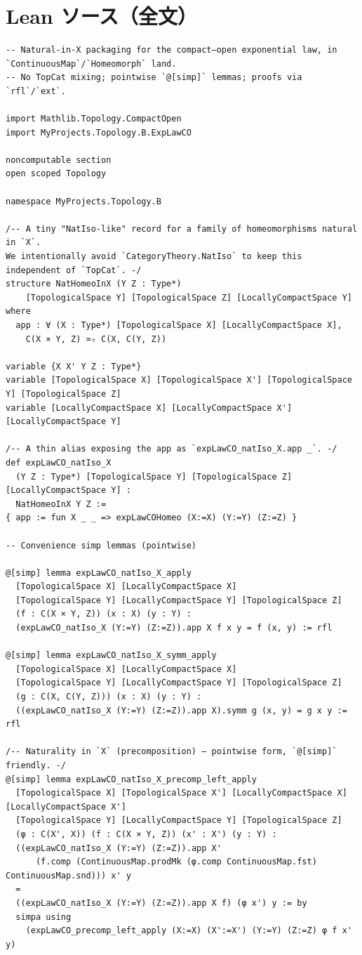 \documentclass[12pt]{article}
\theoremstyle{definition}
\begin{document}
\section*{Lean ソース（全文）}
\begin{lstlisting}
-- Natural-in-X packaging for the compact–open exponential law, in `ContinuousMap`/`Homeomorph` land.
-- No TopCat mixing; pointwise `@[simp]` lemmas; proofs via `rfl`/`ext`.

import Mathlib.Topology.CompactOpen
import MyProjects.Topology.B.ExpLawCO

noncomputable section
open scoped Topology

namespace MyProjects.Topology.B

/-- A tiny "NatIso-like" record for a family of homeomorphisms natural in `X`.
We intentionally avoid `CategoryTheory.NatIso` to keep this independent of `TopCat`. -/
structure NatHomeoInX (Y Z : Type*)
    [TopologicalSpace Y] [TopologicalSpace Z] [LocallyCompactSpace Y] where
  app : ∀ (X : Type*) [TopologicalSpace X] [LocallyCompactSpace X],
    C(X × Y, Z) ≃ₜ C(X, C(Y, Z))

variable {X X' Y Z : Type*}
variable [TopologicalSpace X] [TopologicalSpace X'] [TopologicalSpace Y] [TopologicalSpace Z]
variable [LocallyCompactSpace X] [LocallyCompactSpace X'] [LocallyCompactSpace Y]

/-- A thin alias exposing the app as `expLawCO_natIso_X.app _`. -/
def expLawCO_natIso_X
  (Y Z : Type*) [TopologicalSpace Y] [TopologicalSpace Z] [LocallyCompactSpace Y] :
  NatHomeoInX Y Z :=
{ app := fun X _ _ => expLawCOHomeo (X:=X) (Y:=Y) (Z:=Z) }

-- Convenience simp lemmas (pointwise)

@[simp] lemma expLawCO_natIso_X_apply
  [TopologicalSpace X] [LocallyCompactSpace X]
  [TopologicalSpace Y] [LocallyCompactSpace Y] [TopologicalSpace Z]
  (f : C(X × Y, Z)) (x : X) (y : Y) :
  (expLawCO_natIso_X (Y:=Y) (Z:=Z)).app X f x y = f (x, y) := rfl

@[simp] lemma expLawCO_natIso_X_symm_apply
  [TopologicalSpace X] [LocallyCompactSpace X]
  [TopologicalSpace Y] [LocallyCompactSpace Y] [TopologicalSpace Z]
  (g : C(X, C(Y, Z))) (x : X) (y : Y) :
  ((expLawCO_natIso_X (Y:=Y) (Z:=Z)).app X).symm g (x, y) = g x y := rfl

/-- Naturality in `X` (precomposition) — pointwise form, `@[simp]` friendly. -/
@[simp] lemma expLawCO_natIso_X_precomp_left_apply
  [TopologicalSpace X] [TopologicalSpace X'] [LocallyCompactSpace X] [LocallyCompactSpace X']
  [TopologicalSpace Y] [LocallyCompactSpace Y] [TopologicalSpace Z]
  (φ : C(X', X)) (f : C(X × Y, Z)) (x' : X') (y : Y) :
  ((expLawCO_natIso_X (Y:=Y) (Z:=Z)).app X'
      (f.comp (ContinuousMap.prodMk (φ.comp ContinuousMap.fst) ContinuousMap.snd))) x' y
  =
  ((expLawCO_natIso_X (Y:=Y) (Z:=Z)).app X f) (φ x') y := by
  simpa using
    (expLawCO_precomp_left_apply (X:=X) (X':=X') (Y:=Y) (Z:=Z) φ f x' y)


\end{lstlisting}
\end{document}
